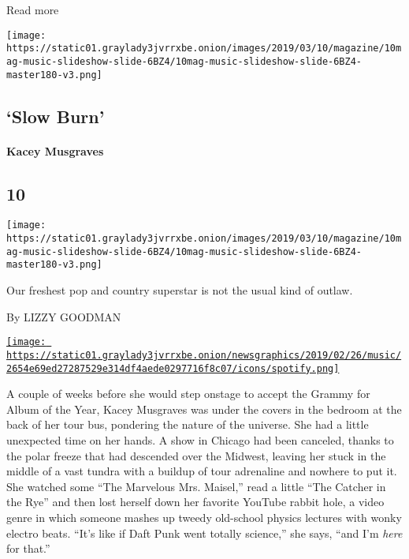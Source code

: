 Read more

\texttt{[image: https://static01.graylady3jvrrxbe.onion/images/2019/03/10/magazine/10mag-music-slideshow-slide-6BZ4/10mag-music-slideshow-slide-6BZ4-master180-v3.png]}

\hypertarget{--slow-burn}{%
\subsection{\texorpdfstring{ `Slow
Burn'}{  `Slow Burn'}}\label{--slow-burn}}

\hypertarget{kacey-musgraves}{%
\paragraph{Kacey Musgraves}\label{kacey-musgraves}}

\hypertarget{10}{%
\subsection{10}\label{10}}

\texttt{[image: https://static01.graylady3jvrrxbe.onion/images/2019/03/10/magazine/10mag-music-slideshow-slide-6BZ4/10mag-music-slideshow-slide-6BZ4-master180-v3.png]}

Our freshest pop and country superstar is not the usual kind of outlaw.

By LIZZY GOODMAN

\href{https://open.spotify.com/track/6ET9kf9riLETWs9lePUEAI}{\texttt{[image: https://static01.graylady3jvrrxbe.onion/newsgraphics/2019/02/26/music/2654e69ed27287529e314df4aede0297716f8c07/icons/spotify.png]}}

A couple of weeks before she would step onstage to accept the Grammy for
Album of the Year, Kacey Musgraves was under the covers in the bedroom
at the back of her tour bus, pondering the nature of the universe. She
had a little unexpected time on her hands. A show in Chicago had been
canceled, thanks to the polar freeze that had descended over the
Midwest, leaving her stuck in the middle of a vast tundra with a buildup
of tour adrenaline and nowhere to put it. She watched some ``The
Marvelous Mrs. Maisel,'' read a little ``The Catcher in the Rye'' and
then lost herself down her favorite YouTube rabbit hole, a video genre
in which someone mashes up tweedy old-school physics lectures with wonky
electro beats. ``It's like if Daft Punk went totally science,'' she
says, ``and I'm \emph{here} for that.''

